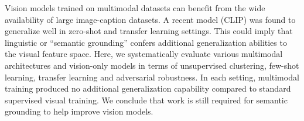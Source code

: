 Vision models trained on multimodal datasets can benefit from the wide availability of large image-caption datasets. A recent model (CLIP) was found to generalize well in zero-shot and transfer learning settings. This could imply that linguistic or ``semantic grounding'' confers additional generalization abilities to the visual feature space. Here, we systematically evaluate various multimodal architectures and vision-only models in terms of unsupervised clustering, few-shot learning, transfer learning and adversarial robustness. In each setting, multimodal training produced no additional generalization capability compared to standard supervised visual training. We conclude that work is still required for semantic grounding to help improve vision models.
